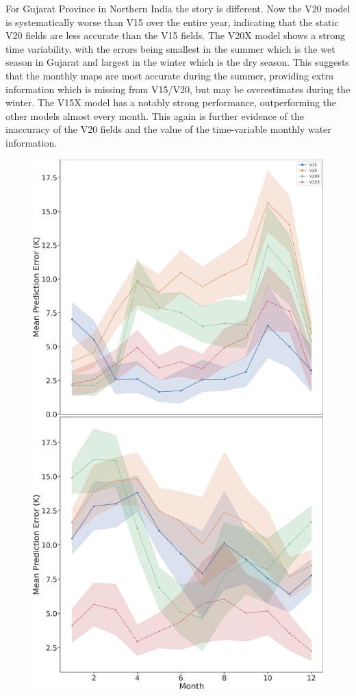 \documentclass[twocolumn]{article}
\begin{document}
	
	\noindent For Gujarat Province in Northern India the story is different. Now the V20 model is systematically worse than V15 over the entire year, indicating that the static V20 fields are less accurate than the V15 fields. The V20X model shows a strong time variability, with the errors being smallest in the summer which is the wet season in Gujarat and largest in the winter which is the dry season. This suggests that the monthly maps are most accurate during the summer, providing extra information which is missing from V15/V20, but may be overestimates during the winter. The V15X model has a notably strong performance, outperforming the other models almost every month. This again is further evidence of the inaccuracy of the V20 fields and the value of the time-variable monthly water information.
	\begin{figure}
		\includegraphics[width=\columnwidth]{stacked_timeseries_lakes_new.png}

\end{figure}
\end{document}
